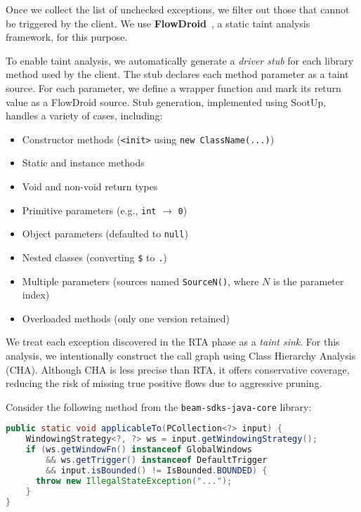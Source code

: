 Once we collect the list of unchecked exceptions, we filter out those that cannot be triggered by the client. We use \textbf{FlowDroid}~\cite{Arzt14:_flowdroid}, a static taint analysis framework, for this purpose.

To enable taint analysis, we automatically generate a \textit{driver stub} for each library method used by the client. The stub declares each method parameter as a taint source. For each parameter, we define a wrapper function and mark its return value as a FlowDroid source. Stub generation, implemented using SootUp, handles a variety of cases, including:
\begin{itemize}
  \item Constructor methods (\texttt{<init>} using \texttt{new ClassName(...)})
  \item Static and instance methods
  \item Void and non-void return types
  \item Primitive parameters (e.g., \texttt{int} $\rightarrow$ \texttt{0})
  \item Object parameters (defaulted to \texttt{null})
  \item Nested classes (converting \texttt{\$} to \texttt{.})
  \item Multiple parameters (sources named \texttt{SourceN()}, where $N$ is the parameter index)
  \item Overloaded methods (only one version retained)
\end{itemize}

We treat each exception discovered in the RTA phase as a \textit{taint sink}. For this analysis, we intentionally construct the call graph using Class Hierarchy Analysis (CHA). Although CHA is less precise than RTA, it offers conservative coverage, reducing the risk of missing true positive flows due to aggressive pruning.

Consider the following method from the \texttt{beam-sdks-java-core} library:

\begin{lstlisting}[language=Java,breaklines=true,breakatwhitespace=false,basicstyle=\scriptsize\ttfamily]
public static void applicableTo(PCollection<?> input) {
    WindowingStrategy<?, ?> ws = input.getWindowingStrategy();
    if (ws.getWindowFn() instanceof GlobalWindows
        && ws.getTrigger() instanceof DefaultTrigger
        && input.isBounded() != IsBounded.BOUNDED) {
      throw new IllegalStateException("...");
    }
}
\end{lstlisting}

